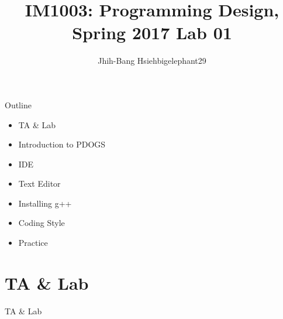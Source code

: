 \documentclass[t]{beamer}
\title{IM1003: Programming Design, Spring 2017  \linebreak Lab 01}
\author[bigelephant29]{Jhih-Bang Hsieh\linebreak \small{bigelephant29}}
\institute{\textbf{National Taiwan University}}
\date{}
\begin{document}
\begin{frame}
\maketitle
\end{frame}

\begin{frame}{Outline}
\begin{itemize}
\item TA \& Lab
\item Introduction to PDOGS
\item IDE
\item Text Editor
\item Installing g++
\item Coding Style
\item Practice
\end{itemize}
\end{frame}

\section{TA \& Lab}
\begin{frame}{TA \& Lab}

\end{frame}
\end{document}
